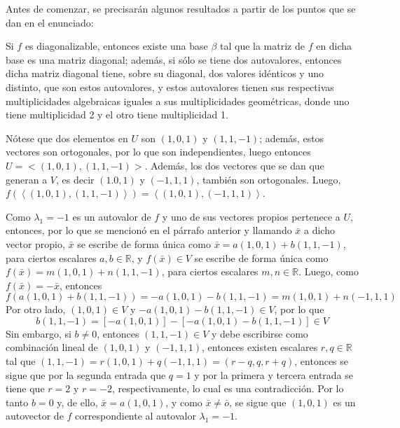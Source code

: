\begin{solucion}
 Antes de comenzar, se precisar\'an algunos resultados a partir de los puntos que se dan en el enunciado:
 \par 
 Si $f$ es diagonalizable, entonces existe una base $\beta$ tal que la matriz de $f$ en dicha base es una matriz diagonal; adem\'as, si s\'olo se tiene dos autovalores, entonces dicha matriz diagonal tiene, sobre su diagonal, dos valores id\'enticos y uno distinto, que son estos autovalores, y estos autovalores tienen sus respectivas multiplicidades algebraicas iguales a sus multiplicidades geom\'etricas, donde uno tiene multiplicidad 2 y el otro tiene multiplicidad 1.
 \par 
 N\'otese que dos elementos en $U$ son $(1,0,1)$ y $(1,1,-1)$; adem\'as, estos vectores son ortogonales, por lo que son independientes, luego entonces $U = <(1,0,1), (1,1,-1)>$. Adem\'as, los dos vectores que se dan que generan a $V$, es decir $(1.0,1)$ y $(-1,1,1)$, tambi\'en son ortogonales. Luego, $f\left(\left< (1,0,1), (1,1,-1) \right>\right) = \left< (1,0,1), (-1,1,1) \right>$.
 \par 
 Como $\lambda_1 = -1$ es un autovalor de $f$ y uno de sus vectores propios pertenece a $U$, entonces, por lo que se mencion\'o en el p\'arrafo anterior y llamando $\bar{x}$ a dicho vector propio, $\bar{x}$ se escribe de forma \'unica como $\bar{x} = a(1,0,1) + b(1,1,-1)$, para ciertos escalares $a,b\in\mathbb{R}$, y $f\left(\bar{x}\right)\in V$ se escribe de forma \'unica  como $f\left(\bar{x} \right) = m(1,0,1) + n(1,1,-1)$, para ciertos escalares $m,n\in\mathbb{R}$. Luego, como $f\left( \bar{x} \right) = -\bar{x}$, entonces 
 \begin{equation*}
  f\left( a(1,0,1) + b(1,1,-1)\right) = -a(1,0,1) -b(1,1,-1) = m(1,0,1) + n(-1,1,1)
 \end{equation*}
 Por otro lado, $(1,0,1) \in V$ y $-a(1,0,1)-b(1,1,-1) \in V$, por lo que
 \begin{equation*}
  b(1,1,-1) = \left[ -a(1,0,1) \right] - \left[ -a(1,0,1) - b(1,1,-1) \right] \in V
 \end{equation*}
 Sin embargo, si $b\neq 0$, entonces $(1,1,-1)\in V$ y debe escribirse como combinaci\'on lineal de $(1,0,1)$ y $(-1,1,1)$, entonces existen escalares $r,q\in\mathbb{R}$ tal que $(1,1,-1) = r(1,0,1)+q(-1,1,1) = (r-q, q, r+q)$, entonces se sigue que por la segunda entrada que $q = 1$ y por la primera y tercera entrada se tiene que $r=2$ y $r=-2$, respectivamente, lo cual es una contradicci\'on. Por lo tanto $b=0$ y, de ello, $\bar{x}=a(1,0,1)$, y como $\bar{x}\neq \bar{o}$, se sigue que $(1,0,1)$ es un autovector de $f$ correspondiente al autovalor $\lambda_1 = -1$.

\end{solucion}

